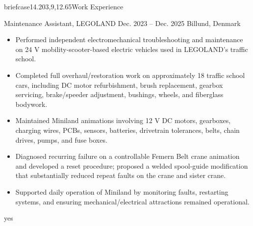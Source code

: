 \documentclass[10pt,a4paper]{article}
\begin{document}
\begin{minipage}[t]{\sidewidth}
{\begin{minipage}[t][22.50cm][t]{\dimexpr\sidewidth-2\fboxsep\relax}
\begin{minipage}[t]{\dimexpr\linewidth-6mm\relax}
  \end{minipage}%
  \end{minipage}%
  }
\end{minipage}%
\hspace{\gapwidth}%
\begin{minipage}[t]{\mainwidth}
  \vspace{0pt}
  \RaggedRight
  \small

  \begin{connectedsection}{briefcase}{14.20}{3,9,12.65}{Work Experience}
    \vspace{-10pt}\par
    \workentry
      {Maintenance Assistant, LEGOLAND}
      {Dec. 2023 -- Dec. 2025}
      {Billund, Denmark}
      {
        \begin{itemize}
          \item Performed independent electromechanical troubleshooting and maintenance on 24 V mobility-scooter-based electric vehicles used in LEGOLAND’s traffic school.
          \item Completed full overhaul/restoration work on approximately 18 traffic school cars, including DC motor refurbishment, brush replacement, gearbox servicing, brake/speeder adjustment, bushings, wheels, and fiberglass bodywork.
          \item Maintained Miniland animations involving 12 V DC motors, gearboxes, charging wires, PCBs, sensors, batteries, drivetrain tolerances, belts, chain drives, pumps, and fuse boxes.
          \item Diagnosed recurring failure on a controllable Femern Belt crane animation and developed a reset procedure; proposed a welded spool-guide modification that substantially reduced repeat faults on the crane and sister crane.
          \item Supported daily operation of Miniland by monitoring faults, restarting systems, and ensuring mechanical/electrical attractions remained operational.
        \end{itemize}
      }
      {yes}


\end{connectedsection}
\end{minipage}
\end{document}
